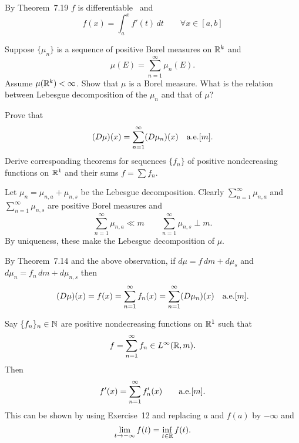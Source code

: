 \begin{enumerate}
 By Theorem~7.19
$f$ is differentiable \aded\ and
\begin{equation*}
f(x) = \int_a^x f'(t)\,dt \qquad \forall x\in[a,b]
\end{equation*}


\begin{excopy}
Suppose \(\{\mu_n\}\) is a sequence of positive Borel measures on \(\mathbb{R}^k\) and
\begin{equation*}
\mu(E) = \sum_{n=1}^\infty \mu_n(E).
\end{equation*}
Assume \(\mu(\mathbb{R}^k)<\infty\). Show that \(\mu\) is a Borel measure.
What is the relation between Lebesgue decomposition of the \(\mu_n\) 
and that of \(\mu\)?

Prove that 
\begin{equation*}
(D\mu)(x) = \sum_{n=1}^\infty (D\mu_n)(x) \quad \textrm{a.e.}[m].
\end{equation*}
Derive corresponding theorems for sequences \(\{f_n\}\) 
of positive nondecreasing functions on \(\mathbb{R}^1\) and their sums \(f=\sum f_n\).
\end{excopy}

Let \(\mu_n = \mu_{n,a} + \mu_{n,s}\) be the Lebesgue decomposition.
Clearly 
\(\sum_{n=1}^\infty \mu_{n,a}\)
and
\(\sum_{n=1}^\infty \mu_{n,s}\)
are positive Borel measures and
\begin{equation*}
\sum_{n=1}^\infty \mu_{n,a} \ll m 
\qquad
\sum_{n=1}^\infty \mu_{n,s} \perp m.
\end{equation*}
By uniqueness, these make the Lebesgue decomposition of \(\mu\). 

By Theorem~7.14 \cite{RudinRCA87} and the above observation, if 
\(d\mu = f\,dm + d\mu_s\) and
\(d\mu_n = f_n\,dm + d\mu_{n,s}\)
then 
\begin{equation*}
(D\mu)(x) = f(x) = \sum_{n=1}^\infty f_n(x) = \sum_{n=1}^\infty (D\mu_n)(x) 
\quad\textrm{a.e.}[m].
\end{equation*}

Say \(\{f_n\}_n\in\mathbb{N}\) are positive nondecreasing functions on \(\mathbb{R}^1\)
such that 
\begin{equation*}
f = \sum_{n=1}^\infty f_n \in L^\infty(\mathbb{R},m).
\end{equation*}
Then
\begin{equation*}
f'(x) = \sum_{n=1}^\infty f_n'(x) \qquad \textrm{a.e.}[m].
\end{equation*}
This can be shown by using Exercise~12 and replacing $a$ and \(f(a)\)
by \(-\infty\) and 
\begin{equation*}
\lim_{t\to-\infty} f(t) = \inf_{t\in\mathbb{R}} f(t).
\end{equation*}



\end{enumerate}
